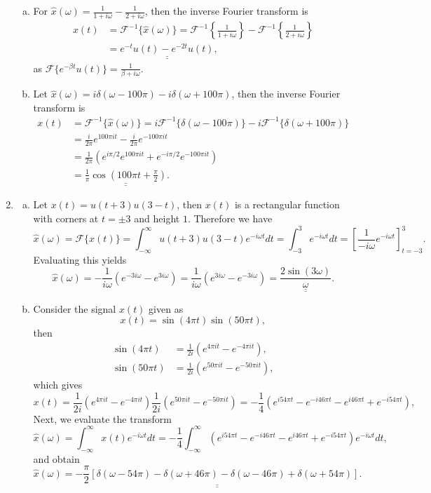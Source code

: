 \begin{enumerate}
\begin{enumerate}[a)]
\item For $\hat{x}(\omega)=\frac{1}{1+i\omega}-\frac{1}{2+i\omega}$, then the inverse Fourier transform is
\begin{align*}
    x(t)&=\mathcal{F}^{-1}\{\hat{x}(\omega)\}=\mathcal{F}^{-1}\left\{\frac{1}{1+i\omega}\right\}-\mathcal{F}^{-1}\left\{\frac{1}{2+i\omega}\right\} \\
    &=\underline{\underline{e^{-t}u(t)-e^{-2t}u(t)}},
\end{align*}
as $\mathcal{F}\{e^{-\beta t}u(t)\}=\frac{1}{\beta+i\omega}$. 

\item Let $\hat{x}(\omega)=i\delta(\omega-100\pi)-i\delta(\omega+100\pi)$, then the inverse Fourier transform is
\begin{align*}
    x(t)&=\mathcal{F}^{-1}\{\hat{x}(\omega)\}=i\mathcal{F}^{-1}\{\delta(\omega-100\pi)\}-i\mathcal{F}^{-1}\{\delta(\omega+100\pi)\} \\
    &=\frac{i}{2\pi}e^{100\pi it}-\frac{i}{2\pi}e^{-100\pi it} \\
    &=\frac{1}{2\pi}(e^{i\pi/2}e^{100\pi i t}+e^{-i\pi/2}e^{-100\pi i t}) \\
    &=\underline{\underline{\frac{1}{\pi}\cos\left(100\pi t+\frac{\pi}{2}\right)}}.
\end{align*}
\end{enumerate}

\item   
\begin{enumerate}[a)]
\item Let $x(t)=u(t+3)u(3-t)$, then $x(t)$ is a rectangular function with corners at $t=\pm 3$ and height $1$. Therefore we have 
$$\hat{x}(\omega)=\mathcal{F}\{x(t)\}=\int_{-\infty}^{\infty}u(t+3)u(3-t)e^{-i\omega t}dt=\int_{-3}^{3}e^{-i\omega t}dt=\left[\frac{1}{-i\omega}e^{-i\omega t}\right]_{t=-3}^{3}.$$
Evaluating this yields
$$\hat{x}(\omega)=-\frac{1}{i\omega}(e^{-3i\omega}-e^{3i\omega})=\frac{1}{i\omega}(e^{3i\omega}-e^{-3i\omega})=\underline{\underline{\frac{2\sin(3\omega)}{\omega}}}.$$

\item Consider the signal $x(t)$ given as
$$x(t)=\sin(4\pi t)\sin(50\pi t),$$
then 
\begin{align*}
    \sin(4\pi t)&=\frac{1}{2i}(e^{4\pi i t}-e^{-4\pi it}), \\
    \sin(50\pi t)&=\frac{1}{2i}(e^{50\pi it}-e^{-50\pi it}),
\end{align*}
which gives
$$x(t)=\frac{1}{2i}\left(e^{4\pi it}-e^{-4\pi it}\right)\frac{1}{2i}\left(e^{50\pi it}-e^{-50\pi it}\right)=-\frac{1}{4}\left(e^{i54\pi t}-e^{-i46\pi t}-e^{i46\pi t}+e^{-i54\pi t}\right),$$
Next, we evaluate the transform
$$\hat{x}(\omega)=\int_{-\infty}^{\infty}x(t)e^{-i\omega t}dt=-\frac{1}{4}\int_{-\infty}^{\infty}\left(e^{i54\pi t}-e^{-i46\pi t}-e^{i46\pi t}+e^{-i54\pi t}\right)e^{-i\omega t}dt,$$
and obtain
$$\hat{x}(\omega)=\underline{\underline{-\frac{\pi}{2}[\delta(\omega-54\pi)-\delta(\omega+46\pi)-\delta(\omega-46\pi)+\delta(\omega+54\pi)]}}.$$


\end{enumerate}
\end{enumerate}
